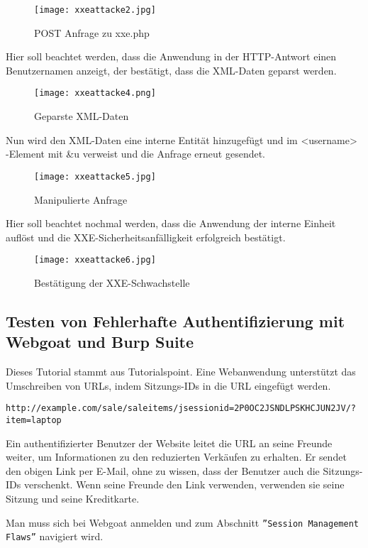\begin{figure}[h]
	\centering
	\texttt{[image: xxeattacke2.jpg]}
	\caption{POST Anfrage zu xxe.php}
\end{figure}

Hier soll beachtet werden, dass die Anwendung in der HTTP-Antwort einen Benutzernamen anzeigt, der bestätigt, dass die XML-Daten geparst werden.

\begin{figure}[h]
	\centering
	\texttt{[image: xxeattacke4.png]}
	\caption{Geparste XML-Daten}
\end{figure}

Nun wird den XML-Daten eine interne Entität hinzugefügt und im <username> -Element mit \&u  verweist und die Anfrage erneut gesendet.

\newpage

\begin{figure}[h]
	\centering
	\texttt{[image: xxeattacke5.jpg]}
	\caption{Manipulierte Anfrage}
\end{figure}

Hier soll beachtet nochmal werden, dass die Anwendung der interne Einheit auflöst und die XXE-Sicherheitsanfälligkeit erfolgreich bestätigt.

\begin{figure}[h]
	\centering
	\texttt{[image: xxeattacke6.jpg]}
	\caption{Bestätigung der XXE-Schwachstelle}
\end{figure}

\newpage

\subsection{Testen von Fehlerhafte Authentifizierung mit Webgoat und Burp Suite}
Dieses Tutorial stammt aus Tutorialspoint\cite{tpfa15}.
Eine Webanwendung unterstützt das Umschreiben von URLs, indem Sitzungs-IDs in die URL eingefügt werden. 

\texttt{http://example.com/sale/saleitems/jsessionid=2P0OC2JSNDLPSKHCJUN2JV/?item=laptop}

Ein authentifizierter Benutzer der Website leitet die URL an seine Freunde weiter, um Informationen zu den reduzierten Verkäufen zu erhalten. Er sendet den obigen Link per E-Mail, ohne zu wissen, dass der Benutzer auch die Sitzungs-IDs verschenkt. Wenn seine Freunde den Link verwenden, verwenden sie seine Sitzung und seine Kreditkarte.

Man muss sich bei Webgoat anmelden und zum Abschnitt \texttt{''Session Management Flaws''} navigiert wird.

